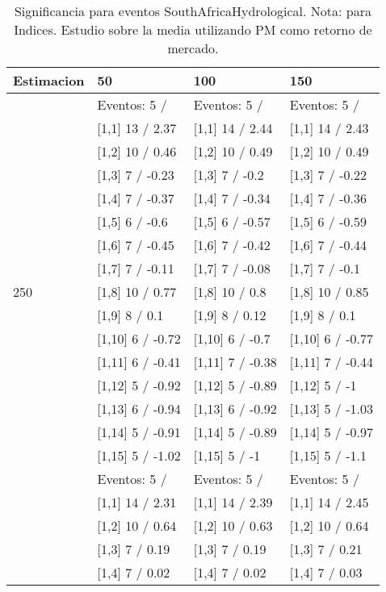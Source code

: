 \begin{table}

\caption{Significancia para eventos SouthAfricaHydrological. Nota: para Indices. Estudio sobre la media utilizando PM como retorno de mercado.}
\centering
\begin{tabular}[t]{llll}
\toprule
Estimacion & 50 & 100 & 150\\
\midrule
 & Eventos:  5 / & Eventos:  5 / & Eventos:  5 /\\
 & {}[1,1] 13  / 2.37 & {}[1,1] 14  / 2.44 & {}[1,1] 14  / 2.43\\
 & {}[1,2] 10  / 0.46 & {}[1,2] 10  / 0.49 & {}[1,2] 10  / 0.49\\
 & {}[1,3] 7  / -0.23 & {}[1,3] 7  / -0.2 & {}[1,3] 7  / -0.22\\
 & {}[1,4] 7  / -0.37 & {}[1,4] 7  / -0.34 & {}[1,4] 7  / -0.36\\
\addlinespace
 & {}[1,5] 6  / -0.6 & {}[1,5] 6  / -0.57 & {}[1,5] 6  / -0.59\\
 & {}[1,6] 7  / -0.45 & {}[1,6] 7  / -0.42 & {}[1,6] 7  / -0.44\\
 & {}[1,7] 7  / -0.11 & {}[1,7] 7  / -0.08 & {}[1,7] 7  / -0.1\\
250 & {}[1,8] 10  / 0.77 & {}[1,8] 10  / 0.8 & {}[1,8] 10  / 0.85\\
 & {}[1,9] 8  / 0.1 & {}[1,9] 8  / 0.12 & {}[1,9] 8  / 0.1\\
\addlinespace
 & {}[1,10] 6  / -0.72 & {}[1,10] 6  / -0.7 & {}[1,10] 6  / -0.77\\
 & {}[1,11] 6  / -0.41 & {}[1,11] 7  / -0.38 & {}[1,11] 7  / -0.44\\
 & {}[1,12] 5  / -0.92 & {}[1,12] 5  / -0.89 & {}[1,12] 5  / -1\\
 & {}[1,13] 6  / -0.94 & {}[1,13] 6  / -0.92 & {}[1,13] 5  / -1.03\\
 & {}[1,14] 5  / -0.91 & {}[1,14] 5  / -0.89 & {}[1,14] 5  / -0.97\\
\addlinespace
 & {}[1,15] 5  / -1.02 & {}[1,15] 5  / -1 & {}[1,15] 5  / -1.1\\
 & Eventos:  5 / & Eventos:  5 / & Eventos:  5 /\\
 & {}[1,1] 14  / 2.31 & {}[1,1] 14  / 2.39 & {}[1,1] 14  / 2.45\\
 & {}[1,2] 10  / 0.64 & {}[1,2] 10  / 0.63 & {}[1,2] 10  / 0.64\\
 & {}[1,3] 7  / 0.19 & {}[1,3] 7  / 0.19 & {}[1,3] 7  / 0.21\\
\addlinespace
 & {}[1,4] 7  / 0.02 & {}[1,4] 7  / 0.02 & {}[1,4] 7  / 0.03\\

\end{tabular}
\end{table}
